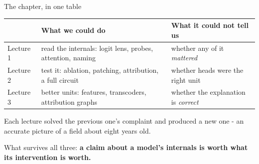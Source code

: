 \documentclass[aspectratio=169]{beamer}
\newcommand{\keybox}[1]{%
  \begin{tcolorbox}[colback=armblue!8, colframe=armblue, boxrule=0.6pt, arc=2pt]
  #1
  \end{tcolorbox}}
\newcommand{\takebox}[1]{%
  \begin{tcolorbox}[colback=paramgreen!8, colframe=paramgreen, boxrule=0.6pt, arc=2pt]
  #1
  \end{tcolorbox}}
\begin{document}
\begin{frame}{The chapter, in one table}
  \vspace{0.4em}
  \begin{center}
  \small
  \begin{tabular}{@{}p{}p{}p{}@{}}
    \toprule
    & \textbf{What we could do} & \textbf{What it could not tell us}\\
    \midrule
    Lecture 1 & read the internals: logit lens, probes, attention, naming & whether any of it
      \emph{mattered}\\[0.5em]
    Lecture 2 & test it: ablation, patching, attribution, a full circuit & whether heads were
      the right unit\\[0.5em]
    Lecture 3 & better units: features, transcoders, attribution graphs & whether the
      explanation is \emph{correct}\\
    \bottomrule
  \end{tabular}
  \end{center}

  \vspace{0.5em}
  \keybox{\small Each lecture solved the previous one's complaint and produced a new one - an
  accurate picture of a field about eight years old.}

  \vspace{0.35em}
  \takebox{\small What survives all three: \textbf{a claim about a model's internals is worth
  what its intervention is worth.}}
\end{frame}
\end{document}
